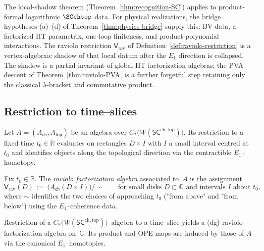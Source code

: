 \begin{remark}
\label{rem:raviolo-recognition-bridge}
The local-shadow theorem (Theorem~\ref{thm:recognition-SC}) applies to
product-formal logarithmic $\SCchtop$ data. For physical realizations,
the bridge hypotheses (a)--(d) of
Theorem~\ref{thm:physics-bridge} supply this: BV data, a factorized HT
parametrix, one-loop finiteness, and product-polynomial
interactions. The raviolo restriction
$\mathsf V_{\mathrm{rav}}$ of Definition~\ref{def:raviolo-restriction}
is a vertex-algebraic shadow of that local datum after the $E_1$
direction is collapsed. The shadow is a partial invariant of global HT factorization algebras; the PVA descent of
Theorem~\ref{thm:raviolo-PVA} is a further forgetful step retaining only the classical $\lambda$-bracket and commutative product.
\end{remark}

\subsection{Restriction to time–slices}
\label{subsec:raviolo-time-slices}
Let $A=(A_{\mathsf{ch}},A_{\mathsf{top}})$ be an algebra over $C_\ast\!\bigl(W(\mathsf{SC}^{\mathrm{ch,top}})\bigr)$.
Its restriction to a fixed time $t_0\in\mathbb R$ evaluates on rectangles
$D\times I$ with $I$ a small interval centred at~$t_0$ and identifies objects along
the topological direction via the contractible $E_1$–homotopy.

\begin{definition}
\label{def:raviolo-restriction}
Fix $t_0\in\mathbb R$. The \emph{raviolo factorization algebra} associated to~$A$ is the assignment
\[
 \mathsf V_{\mathrm{rav}}(D)
 \,:=\,
 \bigl( A_{\mathsf{ch}}(D\times I)\bigr)\big/\!\!\sim
 \qquad
 \text{for small disks $D\subset\mathbb C$ and intervals $I$ about $t_0$,}
\]
where $\sim$ identifies the two choices of approaching $t_0$ ("from above" and "from below")
using the $E_1$–coherence data.
\end{definition}

\begin{proposition}
\label{prop:SC-raviolo}
Restriction of a $C_\ast\!\bigl(W(\mathsf{SC}^{\mathrm{ch,top}})\bigr)$–algebra to a time–slice yields
a (dg) raviolo factorization algebra on~$\mathbb C$. Its product and OPE maps are
induced by those of $A$ via the canonical $E_1$–homotopies.
\end{proposition}


